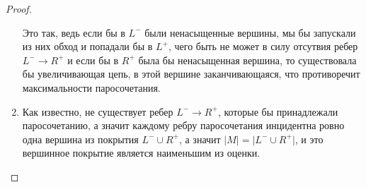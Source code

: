 \begin{proof}
\begin{enumerate}
		Это так, ведь если бы в $L^-$ были ненасыщенные вершины, мы бы запускали из них обход и попадали бы в  $L^+$, чего быть не может в силу отсутвия ребер $L^- \rightarrow R^+$ и если бы в $R^+$ была бы ненасыщенная вершина, то существовала бы увеличивающая цепь, в этой вершине заканчивающаяся, что противоречит максимальности паросочетания.\\
		\item Как известно, не существует ребер  $L^- \rightarrow R^+$, которые бы принадлежали паросочетанию, а значит каждому ребру паросочетания инцидентна ровно одна вершина из покрытия  $L^- \cup R^+$, а значит  $\lvert M \rvert = \lvert L^- \cup R^+ \rvert$, и это вершинное покрытие является наименьшим из оценки.
	\end{enumerate}
\end{proof}
